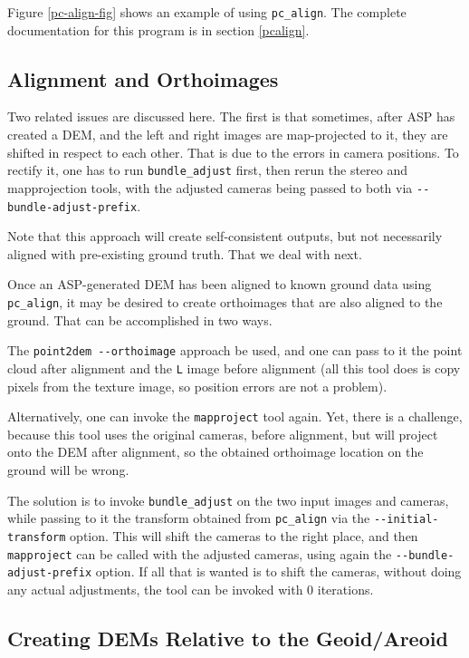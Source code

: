 Figure \ref{pc-align-fig} shows an example of using \texttt{pc\_align}.
The complete documentation for this program is in section
\ref{pcalign}.

\subsection{Alignment and Orthoimages}

Two related issues are discussed here. The first is that sometimes, after ASP has created
a DEM, and the left and right images are map-projected to it, they are shifted in respect to 
each other. That is due to the errors in camera positions. To rectify it, one has to
run \texttt{bundle\_adjust} first, then rerun the stereo and mapprojection tools, with the
adjusted cameras being passed to both via \texttt{-\/-bundle-adjust-prefix}. 

Note that this approach will create self-consistent outputs, but not necessarily aligned
with pre-existing ground truth. That we deal with next. 

Once an ASP-generated DEM has been aligned to known ground data using
\texttt{pc\_align}, it may be desired to create orthoimages that are
also aligned to the ground. That can be accomplished in two ways.

The \texttt{point2dem -\/-orthoimage} approach be used, and one can pass
to it the point cloud after alignment and the \texttt{L} image before alignment
(all this tool does is copy pixels from the texture image, so position errors are not a problem).

Alternatively, one can invoke the \texttt{mapproject} tool again. Yet, there is a challenge,
because this tool uses the original cameras, before alignment, but will project onto the
DEM after alignment, so the obtained orthoimage location on the ground will be wrong. 

The solution is to invoke \texttt{bundle\_adjust} on the two input images and cameras, while passing
to it the transform obtained from \texttt{pc\_align} via the \texttt{-\/-initial-transform}
option. This will shift the cameras to the right place, and then \texttt{mapproject}
can be called with the adjusted cameras, using again the \texttt{-\/-bundle-adjust-prefix}
option. If all that is wanted is to shift the cameras, without doing any actual adjustments,
the tool can be invoked with 0 iterations. 

\subsection{Creating DEMs Relative to the Geoid/Areoid}

